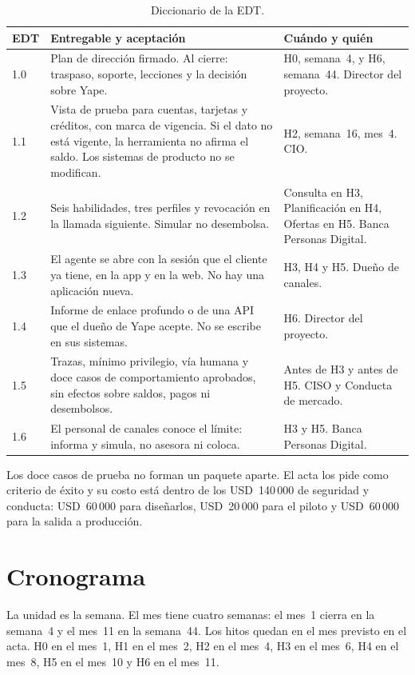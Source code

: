 \documentclass[11pt,a4paper]{article}
\newcommand{\usd}[1]{USD~#1}
\begin{document}
\begin{table}[H]
\centering
\caption{Diccionario de la EDT.}
\footnotesize
\begin{tabularx}{\textwidth}{@{}l X X@{}}
\toprule
\textbf{EDT} & \textbf{Entregable y aceptación} & \textbf{Cuándo y quién} \\
\midrule
1.0 & Plan de dirección firmado. Al cierre: traspaso, soporte, lecciones y la decisión sobre Yape. & H0, semana~4, y H6, semana~44. Director del proyecto. \\
1.1 & Vista de prueba para cuentas, tarjetas y créditos, con marca de vigencia. Si el dato no está vigente, la herramienta no afirma el saldo. Los sistemas de producto no se modifican. & H2, semana~16, mes~4. CIO. \\
1.2 & Seis habilidades, tres perfiles y revocación en la llamada siguiente. Simular no desembolsa. & Consulta en H3, Planificación en H4, Ofertas en H5. Banca Personas Digital. \\
1.3 & El agente se abre con la sesión que el cliente ya tiene, en la app y en la web. No hay una aplicación nueva. & H3, H4 y H5. Dueño de canales. \\
1.4 & Informe de enlace profundo o de una API que el dueño de Yape acepte. No se escribe en sus sistemas. & H6. Director del proyecto. \\
1.5 & Trazas, mínimo privilegio, vía humana y doce casos de comportamiento aprobados, sin efectos sobre saldos, pagos ni desembolsos. & Antes de H3 y antes de H5. CISO y Conducta de mercado. \\
1.6 & El personal de canales conoce el límite: informa y simula, no asesora ni coloca. & H3 y H5. Banca Personas Digital. \\
\bottomrule
\end{tabularx}
\end{table}

Los doce casos de prueba no forman un paquete aparte. El acta los pide como criterio de éxito y su costo está dentro de los \usd{140\,000} de seguridad y conducta: \usd{60\,000} para diseñarlos, \usd{20\,000} para el piloto y \usd{60\,000} para la salida a producción.

\section{Cronograma}

La unidad es la semana. El mes tiene cuatro semanas: el mes~1 cierra en la semana~4 y el mes~11 en la semana~44. Los hitos quedan en el mes previsto en el acta. H0 en el mes~1, H1 en el mes~2, H2 en el mes~4, H3 en el mes~6, H4 en el mes~8, H5 en el mes~10 y H6 en el mes~11.
\end{document}
